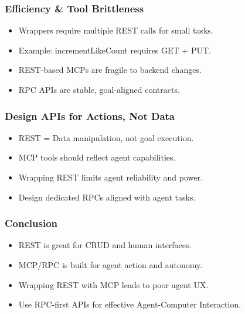 \begin{frame}[fragile]\frametitle{Efficiency \& Tool Brittleness}
\begin{itemize}
  \item Wrappers require multiple REST calls for small tasks.
  \item Example: incrementLikeCount requires GET + PUT.
  \item REST-based MCPs are fragile to backend changes.
  \item RPC APIs are stable, goal-aligned contracts.
\end{itemize}
\end{frame}

\begin{frame}[fragile]\frametitle{Design APIs for Actions, Not Data}
\begin{itemize}
  \item REST = Data manipulation, not goal execution.
  \item MCP tools should reflect agent capabilities.
  \item Wrapping REST limits agent reliability and power.
  \item Design dedicated RPCs aligned with agent tasks.
\end{itemize}
\end{frame}

\begin{frame}[fragile]\frametitle{Conclusion}
\begin{itemize}
  \item REST is great for CRUD and human interfaces.
  \item MCP/RPC is built for agent action and autonomy.
  \item Wrapping REST with MCP leads to poor agent UX.
  \item Use RPC-first APIs for effective Agent-Computer Interaction.
\end{itemize}
\end{frame}







